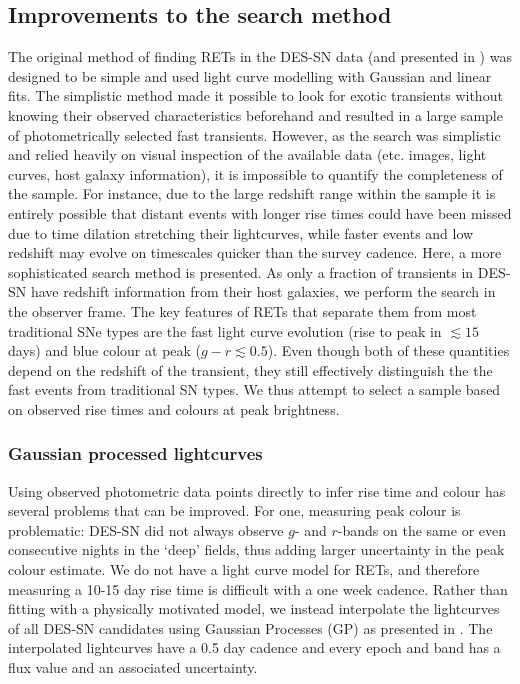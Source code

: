 \documentclass[fleqn,usenatbib,]{mnras}
\begin{document}
\subsection{Improvements to the search method \label{subsec:new_method}}

The original method of finding RETs in the DES-SN data (and presented in ) was designed to be simple and used light curve modelling with Gaussian and linear fits. The simplistic method made it possible to look for exotic transients without knowing their observed characteristics beforehand and resulted in a large sample of photometrically selected fast transients. However, as the search was simplistic and relied heavily on visual inspection of the available data (etc. images, light curves, host galaxy information), it is impossible to quantify the completeness of the sample. For instance, due to the large redshift range within the sample it is entirely possible that distant events with longer rise times could have been missed due to time dilation stretching their lightcurves, while faster events and low redshift may evolve on timescales quicker than the survey cadence. Here, a more sophisticated search method is presented. As only a fraction of transients in DES-SN have redshift information from their host galaxies, we perform the search in the observer frame. The key features of RETs that separate them from most traditional SNe types are the fast light curve evolution (rise to peak in $\lesssim15$ days) and blue colour at peak ($g-r \lesssim 0.5$). Even though both of these quantities depend on the redshift of the transient, they still effectively distinguish the the fast events from traditional SN types. We thus attempt to select a sample based on observed rise times and colours at peak brightness.

\subsubsection{Gaussian processed lightcurves}
Using observed photometric data points directly to infer rise time and colour has several problems that can be improved. For one, measuring peak colour is problematic: DES-SN did not always observe $g$- and $r$-bands on the same or even consecutive nights in the `deep' fields, thus adding larger uncertainty in the peak colour estimate. We do not have a light curve model for RETs, and therefore  measuring a 10-15 day rise time is difficult with a one week  cadence. Rather than fitting with a physically motivated model, we instead interpolate the lightcurves of all DES-SN candidates using Gaussian Processes (GP) as presented in \citet{Pursiainen2020}. The interpolated lightcurves have a 0.5 day cadence and every epoch and band has a flux value and an associated uncertainty. 
\end{document}

